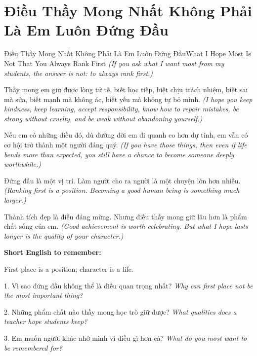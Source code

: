 \section{Điều Thầy Mong Nhất Không Phải Là Em Luôn Đứng Đầu}
\begin{truyen}{Điều Thầy Mong Nhất Không Phải Là Em Luôn Đứng Đầu}{What I Hope Most Is Not That You Always Rank First}
\textit{(If you ask what I want most from my students, the answer is not: to always rank first.)}

Thầy mong em giữ được lòng tử tế, biết học tiếp, biết chịu trách nhiệm, biết sai mà sửa, biết mạnh mà không ác, biết yếu mà không tự bỏ mình.
\textit{(I hope you keep kindness, keep learning, accept responsibility, know how to repair mistakes, be strong without cruelty, and be weak without abandoning yourself.)}

Nếu em có những điều đó, dù đường đời em đi quanh co hơn dự tính, em vẫn có cơ hội trở thành một người đáng quý.
\textit{(If you have those things, then even if life bends more than expected, you still have a chance to become someone deeply worthwhile.)}

Đứng đầu là một vị trí. Làm người cho ra người là một chuyện lớn hơn nhiều.
\textit{(Ranking first is a position. Becoming a good human being is something much larger.)}
\end{truyen}

\begin{baihoc}
Thành tích đẹp là điều đáng mừng. Nhưng điều thầy mong giữ lâu hơn là phẩm chất sống của em.
\textit{(Good achievement is worth celebrating. But what I hope lasts longer is the quality of your character.)}
\end{baihoc}

\begin{ghinhoanh}
\textbf{Short English to remember:}

First place is a position; character is a life.

\end{ghinhoanh}

\begin{tuhocnhanh}
1. Vì sao đứng đầu không thể là điều quan trọng nhất? \textit{Why can first place not be the most important thing?}

2. Những phẩm chất nào thầy mong học trò giữ được? \textit{What qualities does a teacher hope students keep?}

3. Em muốn người khác nhớ mình vì điều gì hơn cả? \textit{What do you most want to be remembered for?}
\end{tuhocnhanh}
\ngancach

